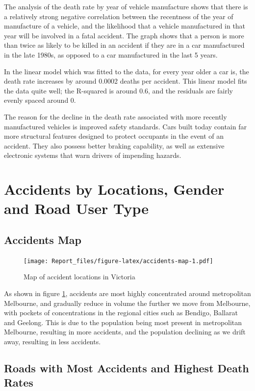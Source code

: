 \documentclass[11pt,a4paper,]{article}
\begin{document}
The analysis of the death rate by year of vehicle manufacture shows that there is a relatively strong negative correlation between the recentness of the year of manufacture of a vehicle, and the likelihood that a vehicle manufactured in that year will be involved in a fatal accident. The graph shows that a person is more than twice as likely to be killed in an accident if they are in a car manufactured in the late 1980s, as opposed to a car manufactured in the last 5 years.

In the linear model which was fitted to the data, for every year older a car is, the death rate increases by around 0.0002 deaths per accident. This linear model fits the data quite well; the R-squared is around 0.6, and the residuals are fairly evenly spaced around 0.

The reason for the decline in the death rate associated with more recently manufactured vehicles is improved safety standards. Cars built today contain far more structural features designed to protect occupants in the event of an accident. They also possess better braking capability, as well as extensive electronic systems that warn drivers of impending hazards.

\section*{Accidents by Locations, Gender and Road User Type}

\subsection*{Accidents Map}

\begin{figure}
\centering
\texttt{[image: Report\_files/figure-latex/accidents-map-1.pdf]}
\caption{\label{fig:accidents-map}Map of accident locations in Victoria}
\end{figure}

As shown in figure \ref{fig:accidents-map}, accidents are most highly concentrated around metropolitan Melbourne, and gradually reduce in volume the further we move from Melbourne, with pockets of concentrations in the regional cities such as Bendigo, Ballarat and Geelong. This is due to the population being most present in metropolitan Melbourne, resulting in more accidents, and the population declining as we drift away, resulting in less accidents.

\subsection*{Roads with Most Accidents and Highest Death Rates}
\end{document}
